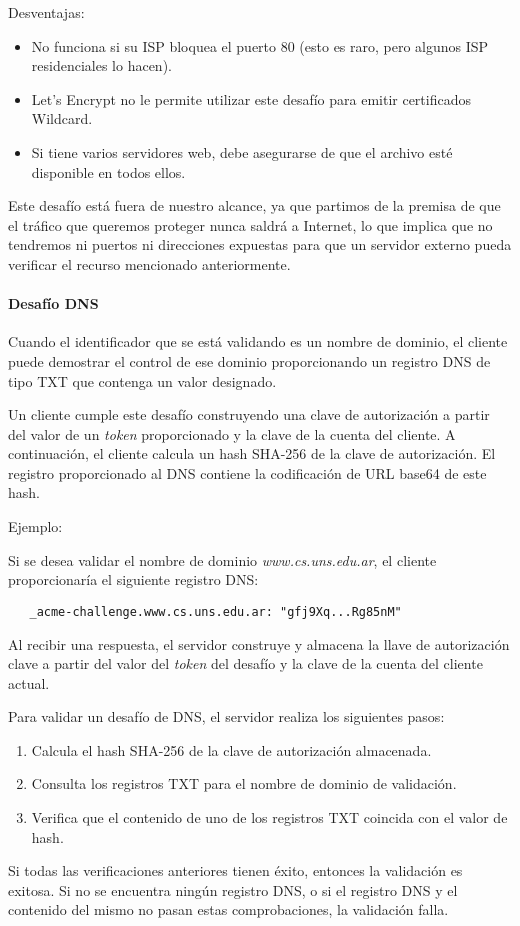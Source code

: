 Desventajas:
\begin{itemize}
   \setlength\itemsep{-0.6em}
   \item No funciona si su ISP bloquea el puerto 80 (esto es raro, pero algunos ISP residenciales lo hacen).
   \item Let's Encrypt no le permite utilizar este desafío para emitir certificados Wildcard.
   \item Si tiene varios servidores web, debe asegurarse de que el archivo esté disponible en todos ellos.
\end{itemize}
   
Este desafío está fuera de nuestro alcance, ya que partimos de la premisa de que 
el tráfico que queremos proteger nunca saldrá a Internet, lo que implica que no 
tendremos ni puertos ni direcciones expuestas para que un servidor externo pueda 
verificar el recurso mencionado anteriormente. 


\paragraph*{Desafío DNS}
Cuando el identificador que se está validando es un nombre de dominio, el cliente 
puede demostrar el control de ese dominio proporcionando un registro DNS de tipo 
TXT que contenga un valor designado.

Un cliente cumple este desafío construyendo una clave de autorización a partir del 
valor de un \emph{token} proporcionado y la clave de la cuenta del cliente. A continuación, el 
cliente calcula un hash SHA-256 de la clave de 
autorización.
El registro proporcionado al DNS contiene la codificación de URL base64 de este 
hash. 

\noindent Ejemplo:

Si se desea validar el nombre de dominio \textit{www.cs.uns.edu.ar}, el cliente 
proporcionaría el siguiente registro DNS:

\begin{verbatim}
   _acme-challenge.www.cs.uns.edu.ar: "gfj9Xq...Rg85nM"
\end{verbatim}

Al recibir una respuesta, el servidor construye y almacena la llave de autorización
clave a partir del valor del \emph{token} del desafío y la clave de la cuenta del cliente actual.

\noindent Para validar un desafío de DNS, el servidor realiza los siguientes pasos:

\begin{enumerate}
   \setlength\itemsep{-0.6em}
   \item Calcula el hash SHA-256 de la clave de autorización almacenada.
   \item Consulta los registros TXT para el nombre de dominio de validación.
   \item Verifica que el contenido de uno de los registros TXT coincida con el valor de hash.
\end{enumerate}

   
Si todas las verificaciones anteriores tienen éxito, entonces la validación es exitosa. 
Si no se encuentra ningún registro DNS, o si el registro DNS y el contenido del mismo 
no pasan estas comprobaciones, la validación falla.